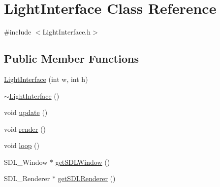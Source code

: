 \hypertarget{class_light_interface}{}\section{Light\+Interface Class Reference}
\label{class_light_interface}


{\ttfamily \#include $<$Light\+Interface.\+h$>$}

\subsection*{Public Member Functions}
\begin{DoxyCompactItemize}
\item 
\mbox{\hyperlink{class_light_interface_a619a9978f9215d6f804667b29afc528c}{Light\+Interface}} (int w, int h)
\item 
\mbox{\hyperlink{class_light_interface_a52deb9879a0cbfaca66175185a60de19}{$\sim$\+Light\+Interface}} ()
\item 
void \mbox{\hyperlink{class_light_interface_ae32d55de072694ee5eda0a1f86b07c09}{update}} ()
\item 
void \mbox{\hyperlink{class_light_interface_a481213025fc413d04ca8f951d5037763}{render}} ()
\item 
void \mbox{\hyperlink{class_light_interface_a452ed732228a1e0eb2742be917d5d0d8}{loop}} ()
\item 
S\+D\+L\+\_\+\+Window $\ast$ \mbox{\hyperlink{class_light_interface_a91bb95a1f628517f249917e380e5dacf}{get\+S\+D\+L\+Window}} ()
\item 
S\+D\+L\+\_\+\+Renderer $\ast$ \mbox{\hyperlink{class_light_interface_a7f7c944f07ba1ae77ba0e6e6bad9fbad}{get\+S\+D\+L\+Renderer}} ()
\end{DoxyCompactItemize}
